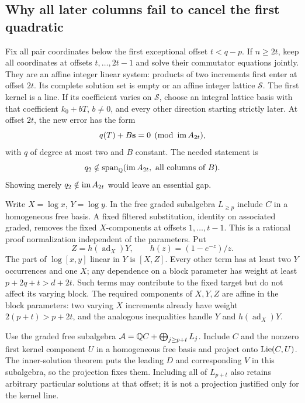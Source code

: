 \subsection{Why all later columns fail to cancel the first quadratic}
Fix all pair coordinates below the first exceptional offset $t<q-p$.
If $n\ge2t$, keep all coordinates at offsets $t,\ldots,2t-1$ and
solve their commutator equations jointly. They are an affine integer
linear system: products of two increments first enter at offset $2t$.
Its complete solution set is empty or an affine integer lattice
$\mathcal S$. The first kernel is a line. If its coefficient varies
on $\mathcal S$, choose an integral lattice basis with that coefficient
$k_0+bT$, $b\ne0$, and every other direction starting strictly later.
At offset $2t$, the new error has the form
\[
 q(T)+B\mathbf s=0\pmod{\operatorname{im} A_{2t}},
\]
with $q$ of degree at most two and $B$ constant. The needed statement is
\begin{equation}\label{eq:full-separation}
 q_2\notin\operatorname{span}_\mathbb Q(\operatorname{im} A_{2t},\text{ all columns of }B).
\end{equation}
Showing merely $q_2\notin\operatorname{im} A_{2t}$ would leave an essential gap.

Write $X=\log x$, $Y=\log y$. In the free graded subalgebra
$L_{\ge p}$ include $C$ in a homogeneous free basis. A fixed filtered
substitution, identity on associated graded, removes the fixed
$X$-components at offsets $1,\ldots,t-1$. This is a rational proof
normalization independent of the parameters. Put
\[
 Z=h(\operatorname{ad}_X)Y,\qquad h(z)=(1-e^{-z})/z.
\]
The part of $\log[x,y]$ linear in $Y$ is $[X,Z]$. Every other term
has at least two $Y$ occurrences and one $X$; any dependence on a
block parameter has weight at least $p+2q+t>d+2t$. Such terms may
contribute to the fixed target but do not affect its varying block.
The required components of $X,Y,Z$ are affine in the block parameters:
two varying $X$ increments already have weight $2(p+t)>p+2t$,
and the analogous inequalities handle $Y$ and $h(\operatorname{ad}_X)Y$.

Use the graded free subalgebra
$\mathcal A=\mathbb Q C+\bigoplus_{j\ge p+t}L_j$. Include $C$ and the
nonzero first kernel component $U$ in a homogeneous free basis and
project onto $\operatorname{Lie}(C,U)$. The inner-solution theorem puts the leading
$D$ and corresponding $V$ in this subalgebra, so the projection fixes
them. Including all of $L_{p+t}$ also retains arbitrary particular
solutions at that offset; it is not a projection justified only for
the kernel line.

